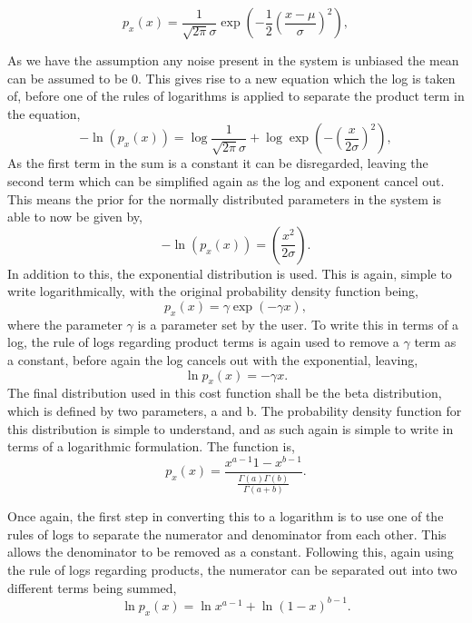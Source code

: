 \begin{equation}\label{pdf_normal}
	p_{x}(x) = \frac{1}{\sqrt{2\pi}\sigma} \exp{(-\frac{1}{2}(\frac{x-\mu}{\sigma})^{2})},
\end{equation}

As we have the assumption any noise present in the system is unbiased the mean can be assumed to be 0. This gives rise to a new equation which the log is taken of, before one of the rules of logarithms is applied to separate the product term in the equation,
\begin{equation}\label{unbiased_log_pdf_normal}
	-\ln(p_{x}(x)) = \log{\frac{1}{\sqrt{2\pi}\sigma}} + \log{\exp{(-(\frac{x}{2\sigma})^{2})}},
\end{equation}
As the first term in the sum is a constant it can be disregarded, leaving the second term which can be simplified again as the log and exponent cancel out. This means the prior for the normally distributed parameters in the system is able to now be given by,
\begin{equation}\label{unbiased_log_pdf_normal}
	-\ln(p_{x}(x)) = (\frac{x^{2}}{2\sigma}).
\end{equation}
In addition to this, the exponential distribution is used. This is again, simple to write logarithmically, with the original probability density function being,
\begin{equation}\label{unbiased_log_pdf_normal}
	p_{x}(x) = \gamma\exp(-\gamma x),
\end{equation}
where the parameter $\gamma$ is a parameter set by the user. To write this in terms of a log, the rule of logs regarding product terms is again used to remove a $\gamma$ term as a constant, before again the log cancels out with the exponential, leaving,
\begin{equation}\label{unbiased_log_pdf_normal}
	\ln{p_{x}(x)} = -\gamma x.
\end{equation}
The final distribution used in this cost function shall be the beta distribution, which is defined by two parameters, a and b. The probability density function for this distribution is simple to understand, and as such again is simple to write in terms of a logarithmic formulation. The function is,
\begin{equation}\label{unbiased_log_pdf_normal}
	p_{x}(x) = \frac{x^{a - 1}1-x^{b - 1}}{\frac{\Gamma(a) \Gamma(b)}{\Gamma(a+b)}}.
\end{equation}

Once again, the first step in converting this to a logarithm is to use one of the rules of logs to separate the numerator and denominator from each other. This allows the denominator to be removed as a constant. Following this, again using the rule of logs regarding products, the numerator can be separated out into two different terms being summed,
\begin{equation}\label{unbiased_log_pdf_normal}
	\ln{p_{x}(x)} = \ln{x^{a-1}} + \ln{(1-x)^{b-1}}.
\end{equation}

